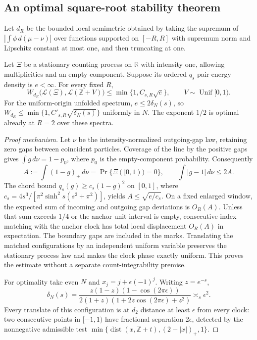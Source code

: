 \subsection{An optimal square-root stability theorem}
Let $d_R$ be the bounded local semimetric obtained by taking the supremum
of $|\int\phi\,d(\mu-\nu)|$ over functions supported on $[-R,R]$ with
supremum norm and Lipschitz constant at most one, and then truncating at one.
\begin{theorem}
Let $\Xi$ be a stationary counting process on $\mathbb R$ with intensity
one, allowing multiplicities and an empty component. Suppose its ordered
$q_s$ pair-energy density is $e<\infty$. For every fixed $R$,
\[
 W_{d_R}\bigl(\mathcal L(\Xi),\mathcal L(\mathbb Z+V)\bigr)
       \le \min\{1,C_{s,R}\sqrt e\},
 \qquad V\sim\operatorname{Unif}[0,1).
\]
For the uniform-origin unfolded spectrum, $e\le2\delta_N(s)$, so
$W_{d_R}\le\min\{1,C'_{s,R}\sqrt{\delta_N(s)}\}$ uniformly in $N$.
The exponent $1/2$ is optimal already at $R=2$ over these spectra.
\end{theorem}
\begin{proof}[Proof mechanism]
Let $\nu$ be the intensity-normalized outgoing-gap law, retaining zero
gaps between coincident particles. Coverage of the line by the positive
gaps gives $\int g\,d\nu=1-p_0$, where $p_0$ is the empty-component
probability. Consequently
\[
 A:=\int(1-g)_+\,d\nu
   =\Pr\{\Xi([0,1))=0\},\qquad
 \int|g-1|\,d\nu\le2A.
\]
The chord bound $q_s(g)\ge c_s(1-g)^2$ on $[0,1]$, where
$c_s=4s^3/[\pi^2\sinh^2s(s^2+\pi^2)]$, yields $A\le\sqrt{e/c_s}$.
On a fixed enlarged window, the expected sum of incoming and outgoing
gap deviations is $O_R(A)$. Unless that sum exceeds $1/4$ or the anchor
unit interval is empty, consecutive-index matching with the anchor clock
has total local displacement $O_R(A)$ in expectation. The boundary gaps
are included in the marks. Translating the matched configurations by an
independent uniform variable preserves the stationary process law and
makes the clock phase exactly uniform. This proves the estimate without
a separate count-integrability premise.

For optimality take even $N$ and $x_j=j+\epsilon(-1)^j$. Writing $z=e^{-s}$,
\[
 \delta_N(s)=\frac{z(1-z)(1-\cos(2\pi\epsilon))}
 {2(1+z)(1+2z\cos(2\pi\epsilon)+z^2)}\asymp_s\epsilon^2.
\]
Every translate of this configuration is at $d_2$ distance at least
$\epsilon$ from every clock: two consecutive points in $[-1,1)$ have
fractional separation $2\epsilon$, detected by the nonnegative admissible
test $\min\{\operatorname{dist}(x,\mathbb Z+t),(2-|x|)_+,1\}$.
\end{proof}

